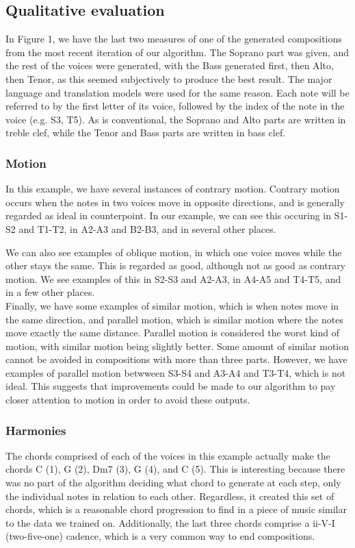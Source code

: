 \documentclass{sig-alternate}
\begin{document}
\subsection{Qualitative evaluation}
In Figure 1, we have the last two measures of one of the generated compositions from the most recent iteration of our algorithm. The Soprano part was given, and the rest of the voices were generated, with the Bass generated first, then Alto, then Tenor, as this seemed subjectively to produce the best result. The major language and translation models were used for the same reason. Each note will be referred to by the first letter of its voice, followed by the index of the note in the voice (e.g. S3, T5). As is conventional, the Soprano and Alto parts are written in treble clef, while the Tenor and Bass parts are written in bass clef.

\subsubsection{Motion}

In this example, we have several instances of contrary motion. Contrary motion occurs when the notes in two voices move in opposite directions, and is generally regarded as ideal in counterpoint. In our example, we can see this occuring in S1-S2 and T1-T2, in A2-A3 and B2-B3, and in several other places.

We can also see examples of oblique motion, in which one voice moves while the other stays the same. This is regarded as good, although not as good as contrary motion. We see examples of this in S2-S3 and A2-A3, in A4-A5 and T4-T5, and in a few other places.\\
Finally, we have some examples of similar motion, which is when notes move in the same direction, and parallel motion, which is similar motion where the notes move exactly the same distance. Parallel motion is considered the worst kind of motion, with similar motion being slightly better. Some amount of similar motion cannot be avoided in compositions with more than three parts. However, we have examples of parallel motion betwween S3-S4 and A3-A4 and T3-T4, which is not ideal. This suggests that improvements could be made to our algorithm to pay closer attention to motion in order to avoid these outputs.

\subsubsection{Harmonies}
The chords comprised of each of the voices in this example actually make the chords C (1), G (2), Dm7 (3), G (4), and C (5). This is interesting because there was no part of the algorithm deciding what chord to generate at each step, only the individual notes in relation to each other. Regardless, it created this set of chords, which is a reasonable chord progression to find in a piece of music similar to the data we trained on. Additionally, the last three chords comprise a ii-V-I (two-five-one) cadence, which is a very common way to end compositions.
\end{document}
